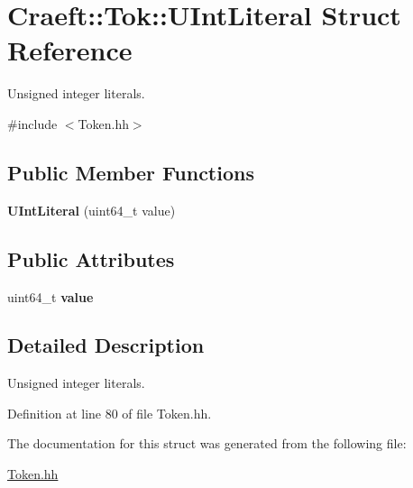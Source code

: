 \hypertarget{struct_craeft_1_1_tok_1_1_u_int_literal}{}\section{Craeft\+:\+:Tok\+:\+:U\+Int\+Literal Struct Reference}
\label{struct_craeft_1_1_tok_1_1_u_int_literal}


Unsigned integer literals.  




{\ttfamily \#include $<$Token.\+hh$>$}

\subsection*{Public Member Functions}
\begin{DoxyCompactItemize}
\item 
\hypertarget{struct_craeft_1_1_tok_1_1_u_int_literal_ac7c51c66686b37c38bbf9f533097ab1e}{}\label{struct_craeft_1_1_tok_1_1_u_int_literal_ac7c51c66686b37c38bbf9f533097ab1e} 
{\bfseries U\+Int\+Literal} (uint64\+\_\+t value)
\end{DoxyCompactItemize}
\subsection*{Public Attributes}
\begin{DoxyCompactItemize}
\item 
\hypertarget{struct_craeft_1_1_tok_1_1_u_int_literal_a4322d36bd8c9e997d73ecc71a91adbc3}{}\label{struct_craeft_1_1_tok_1_1_u_int_literal_a4322d36bd8c9e997d73ecc71a91adbc3} 
uint64\+\_\+t {\bfseries value}
\end{DoxyCompactItemize}


\subsection{Detailed Description}
Unsigned integer literals. 

Definition at line 80 of file Token.\+hh.



The documentation for this struct was generated from the following file\+:\begin{DoxyCompactItemize}
\item 
\hyperlink{_token_8hh}{Token.\+hh}\end{DoxyCompactItemize}
